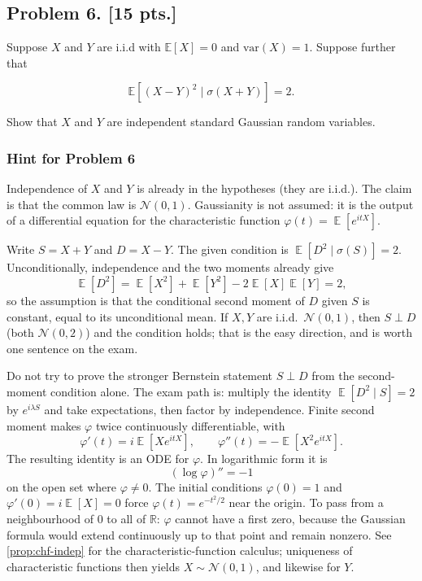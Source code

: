 \documentclass[11pt,a4paper]{article}
\DeclareMathOperator{\E}{\mathbb{E}}
\begin{document}
\subsection{Problem 6. [15 pts.]}
Suppose \( X \) and \( Y \) are i.i.d with \( \mathbb{E}[X] = 0 \) and \( \mathrm{var}(X) = 1 \). Suppose further that

\[
\mathbb{E}[(X - Y)^2 \mid \sigma(X + Y)] = 2.
\]

Show that \( X \) and \( Y \) are independent standard Gaussian random variables.

\setcounter{section}{6}

\subsubsection{Hint for Problem 6}

Independence of \( X \) and \( Y \) is already in the hypotheses (they are i.i.d.). The claim is that the common law is \( \mathcal{N}(0,1) \). Gaussianity is not assumed: it is the output of a differential equation for the characteristic function \( \varphi(t)=\E[e^{itX}] \).

Write \( S=X+Y \) and \( D=X-Y \). The given condition is \( \E[D^{2}\mid\sigma(S)]=2 \). Unconditionally, independence and the two moments already give
\[
\E[D^{2}]
=
\E[X^{2}]+\E[Y^{2}]-2\E[X]\E[Y]
=
2,
\]
so the assumption is that the conditional second moment of \( D \) given \( S \) is constant, equal to its unconditional mean. If \( X,Y \) are i.i.d.\ \( \mathcal{N}(0,1) \), then \( S\perp D \) (both \( \mathcal{N}(0,2) \)) and the condition holds; that is the easy direction, and is worth one sentence on the exam.

Do not try to prove the stronger Bernstein statement \( S\perp D \) from the second-moment condition alone. The exam path is: multiply the identity \( \E[D^{2}\mid S]=2 \) by \( e^{i\lambda S} \) and take expectations, then factor by independence. Finite second moment makes \( \varphi \) twice continuously differentiable, with
\[
\varphi'(t)=i\E[Xe^{itX}],
\qquad
\varphi''(t)=-\E[X^{2}e^{itX}].
\]
The resulting identity is an ODE for \( \varphi \). In logarithmic form it is
\[
(\log\varphi)''=-1
\]
on the open set where \( \varphi\neq 0 \). The initial conditions \( \varphi(0)=1 \) and \( \varphi'(0)=i\E[X]=0 \) force \( \varphi(t)=e^{-t^{2}/2} \) near the origin. To pass from a neighbourhood of \( 0 \) to all of \( \mathbb{R} \): \( \varphi \) cannot have a first zero, because the Gaussian formula would extend continuously up to that point and remain nonzero. See \cref{prop:chf-indep} for the characteristic-function calculus; uniqueness of characteristic functions then yields \( X\sim\mathcal{N}(0,1) \), and likewise for \( Y \).
\end{document}
